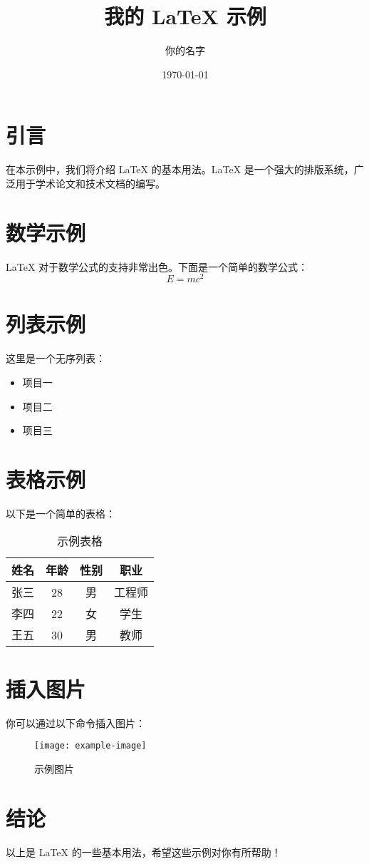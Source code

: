 \documentclass{article} %
\title{我的 LaTeX 示例} %
\author{你的名字} %
\date{\today} %
\begin{document}

\maketitle %

\section{引言} %
在本示例中，我们将介绍 LaTeX 的基本用法。LaTeX 是一个强大的排版系统，广泛用于学术论文和技术文档的编写。  

\section{数学示例} %
LaTeX 对于数学公式的支持非常出色。下面是一个简单的数学公式：  
\begin{equation}  
E = mc^2  
\end{equation}  

\section{列表示例} %
这里是一个无序列表：  
\begin{itemize}  
    \item 项目一  
    \item 项目二  
    \item 项目三  
\end{itemize}  

\section{表格示例} %
以下是一个简单的表格：  
\begin{table}[h]  
    \centering  
    \caption{示例表格} %
    \begin{tabular}{cccc}  
        \toprule  
        姓名 & 年龄 & 性别 & 职业 \\
        \midrule  
        张三 & 28 & 男 & 工程师 \\
        李四 & 22 & 女 & 学生 \\
        王五 & 30 & 男 & 教师 \\
        \bottomrule  
    \end{tabular}  
\end{table}  

\section{插入图片} %
你可以通过以下命令插入图片：  
\begin{figure}[h]  
    \centering  
    \texttt{[image: example-image]} %
    \caption{示例图片}  
    \label{fig:sample}  
\end{figure}  

\section{结论} %
以上是 LaTeX 的一些基本用法，希望这些示例对你有所帮助！   
\end{document}
